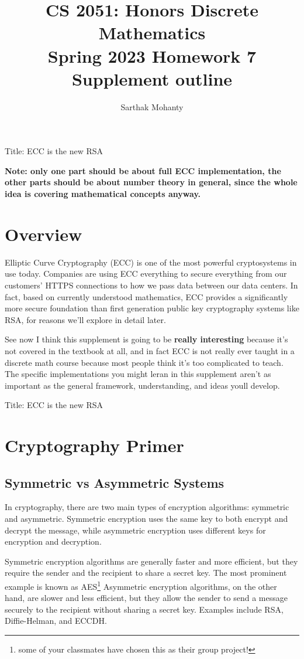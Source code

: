 \documentclass{article}
\title{\vspace{-1cm}CS 2051: Honors Discrete Mathematics \\Spring 2023 Homework 7 Supplement outline}
\author{Sarthak Mohanty }
\date{}
\begin{document}
\maketitle


Title: ECC is the new RSA

\textbf{Note: only one part should be about full ECC implementation, the other parts should be about number theory in general, since the whole idea is covering mathematical concepts anyway.}

\section*{Overview}

Elliptic Curve Cryptography (ECC) is one of the most powerful cryptosystems in use today. Companies are using ECC everything to secure everything from our customers' HTTPS connections to how we pass data between our data centers. In fact, based on currently understood mathematics, ECC provides a significantly more secure foundation than first generation public key cryptography systems like RSA, for reasons we'll explore in detail later.

\vspace{2mm}
See now I think this supplement is going to be \textbf{really interesting} because it's not covered in the textbook at all, and in fact ECC is not really ever taught in a discrete math course because most people think it's too complicated to teach. The specific implementations you might leran in this supplement aren't as important as the general framework, understanding, and ideas youll develop.


Title: ECC is the new RSA


\section*{Cryptography Primer}


\subsection*{Symmetric vs Asymmetric Systems}

In cryptography, there are two main types of encryption algorithms: symmetric and asymmetric. Symmetric encryption uses the same key to both encrypt and decrypt the message, while asymmetric encryption uses different keys for encryption and decryption.

Symmetric encryption algorithms are generally faster and more efficient, but they require the sender and the recipient to share a secret key. The most prominent example is known as AES\footnote{some of your classmates have chosen this as their group project!} Asymmetric encryption algorithms, on the other hand, are slower and less efficient, but they allow the sender to send a message securely to the recipient without sharing a secret key. Examples include RSA, Diffie-Helman, and ECCDH.
\end{document}
